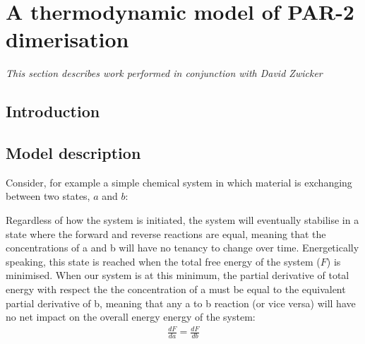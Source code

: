 \documentclass[12pt]{"article"}
\begin{document}
\clearpage
\section{A thermodynamic model of PAR-2 dimerisation}

\textit{This section describes work performed in conjunction with David Zwicker}

\subsection{Introduction}

\subsection{Model description}





Consider, for example a simple chemical system in which material is exchanging between two states, $a$ and $b$:
\begin{center}
\end{center}

Regardless of how the system is initiated, the system will eventually stabilise in a state where the forward and reverse reactions are equal, meaning that the concentrations of a and b will have no tenancy to change over time. Energetically speaking, this state is reached when the total free energy of the system ($F$) is minimised. When our system is at this minimum, the partial derivative of total energy with respect the the concentration of a must be equal to the equivalent partial derivative of b, meaning that any a to b reaction (or vice versa) will have no net impact on the overall energy energy of the system:
\begin{align}
\frac{dF}{da} = \frac{dF}{db}
\end{align}
\end{document}
